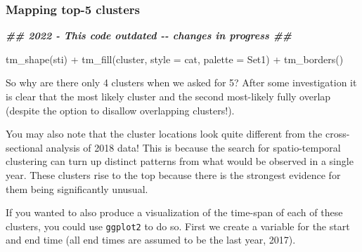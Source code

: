\documentclass[
]{book}
\newenvironment{Shaded}{\begin{snugshade}}{\end{snugshade}}
\newcommand{\AttributeTok}[1]{\textcolor[rgb]{0.77,0.63,0.00}{#1}}
\newcommand{\DocumentationTok}[1]{\textcolor[rgb]{0.56,0.35,0.01}{\textbf{\textit{#1}}}}
\newcommand{\FunctionTok}[1]{\textcolor[rgb]{0.00,0.00,0.00}{#1}}
\newcommand{\NormalTok}[1]{#1}
\newcommand{\SpecialCharTok}[1]{\textcolor[rgb]{0.00,0.00,0.00}{#1}}
\newcommand{\StringTok}[1]{\textcolor[rgb]{0.31,0.60,0.02}{#1}}
\begin{document}
\hypertarget{mapping-top-5-clusters}{%
\subsubsection{Mapping top-5 clusters}\label{mapping-top-5-clusters}}

\begin{Shaded}
\begin{Highlighting}[]
\DocumentationTok{\#\# 2022 {-} This code outdated {-}{-} changes in progress \#\#}

\FunctionTok{tm\_shape}\NormalTok{(sti) }\SpecialCharTok{+} 
  \FunctionTok{tm\_fill}\NormalTok{(}\StringTok{\textquotesingle{}cluster\textquotesingle{}}\NormalTok{,}
          \AttributeTok{style =} \StringTok{\textquotesingle{}cat\textquotesingle{}}\NormalTok{,}
          \AttributeTok{palette =} \StringTok{\textquotesingle{}Set1\textquotesingle{}}\NormalTok{) }\SpecialCharTok{+}
  \FunctionTok{tm\_borders}\NormalTok{()}
\end{Highlighting}
\end{Shaded}

So why are there only 4 clusters when we asked for 5? After some investigation it is clear that the most likely cluster and the second most-likely fully overlap (despite the option to disallow overlapping clusters!).

You may also note that the cluster locations look quite different from the cross-sectional analysis of 2018 data! This is because the search for spatio-temporal clustering can turn up distinct patterns from what would be observed in a single year. These clusters rise to the top because there is the strongest evidence for them being significantly unusual.

If you wanted to also produce a visualization of the time-span of each of these clusters, you could use \texttt{ggplot2} to do so. First we create a variable for the start and end time (all end times are assumed to be the last year, 2017).
\end{document}
